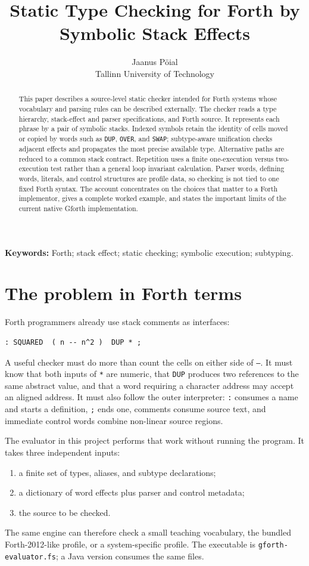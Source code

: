 \documentclass[10pt,a4paper]{article}
\title{Static Type Checking for Forth by Symbolic Stack Effects}
\author{Jaanus Pöial\\Tallinn University of Technology}
\date{}
\begin{document}
\maketitle
\vspace{-1.5em}

\begin{abstract}
This paper describes a source-level static checker intended for Forth systems
whose vocabulary and parsing rules can be described externally.  The checker
reads a type hierarchy, stack-effect and parser specifications, and Forth
source.  It represents each phrase by a pair of symbolic stacks.  Indexed
symbols retain the identity of cells moved or copied by words such as
\texttt{DUP}, \texttt{OVER}, and \texttt{SWAP}; subtype-aware unification
checks adjacent effects and propagates the most precise available type.
Alternative paths are reduced to a common stack contract.  Repetition uses a
finite one-execution versus two-execution test rather than a general loop
invariant calculation.  Parser words, defining words, literals, and control
structures are profile data, so checking is not tied to one fixed Forth
syntax.  The account concentrates on the choices that matter to a Forth
implementor, gives a complete worked example, and states the important limits
of the current native Gforth implementation.
\end{abstract}

\noindent\textbf{Keywords:} Forth; stack effect; static checking; symbolic
execution; subtyping.

\section{The problem in Forth terms}

Forth programmers already use stack comments as interfaces:
\begin{lstlisting}
: SQUARED  ( n -- n^2 )  DUP * ;
\end{lstlisting}
A useful checker must do more than count the cells on either side of
\texttt{--}.  It must know that both inputs of \texttt{*} are numeric, that
\texttt{DUP} produces two references to the same abstract value, and that a
word requiring a character address may accept an aligned address.  It must
also follow the outer interpreter: \texttt{:} consumes a name and starts a
definition, \texttt{;} ends one, comments consume source text, and immediate
control words combine non-linear source regions.

The evaluator in this project performs that work without running the program.
It takes three independent inputs:
\begin{enumerate}
  \item a finite set of types, aliases, and subtype declarations;
  \item a dictionary of word effects plus parser and control metadata;
  \item the source to be checked.
\end{enumerate}
The same engine can therefore check a small teaching vocabulary, the bundled
Forth-2012-like profile, or a system-specific profile.  The executable is
\texttt{gforth-evaluator.fs}; a Java version consumes the same files.
\end{document}
